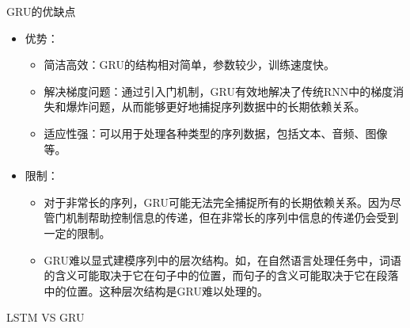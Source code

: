 \begin{frame}{GRU的优缺点}
    \begin{itemize}
        \item 优势：
        \begin{itemize}
            \item 简洁高效：GRU的结构相对简单，参数较少，训练速度快。
            \item 解决梯度问题：通过引入门机制，GRU有效地解决了传统RNN中的梯度消失和爆炸问题，从而能够更好地捕捉序列数据中的长期依赖关系。
            \item 适应性强：可以用于处理各种类型的序列数据，包括文本、音频、图像等。
        \end{itemize}
        \item 限制：
        \begin{itemize}
            \item 对于非常长的序列，GRU可能无法完全捕捉所有的长期依赖关系。因为尽管门机制帮助控制信息的传递，但在非常长的序列中信息的传递仍会受到一定的限制。
            \item GRU难以显式建模序列中的层次结构。如，在自然语言处理任务中，词语的含义可能取决于它在句子中的位置，而句子的含义可能取决于它在段落中的位置。这种层次结构是GRU难以处理的。
        \end{itemize}
    \end{itemize}
\end{frame}


\begin{frame}{LSTM VS GRU}
\begin{table}[!htbp]
	\centering
	\caption{GRU和LSTM对比}
	\label{tab:my-table}
\end{table}
\end{frame}

